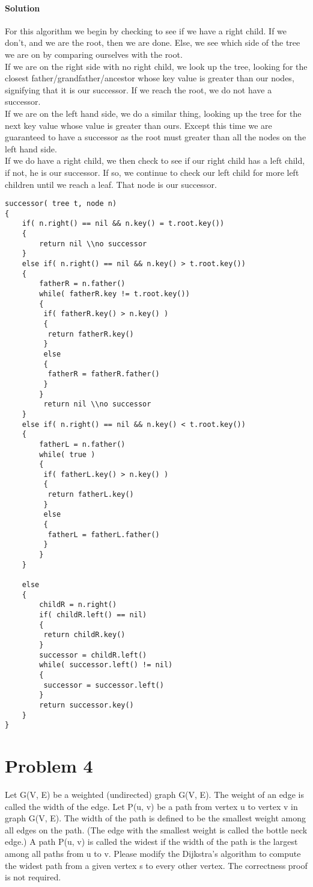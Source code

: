 \documentclass[12pt]{article}
\begin{document}
\paragraph{Solution}
For this algorithm we begin by checking to see if we have a right child.  If we don't, and we are the root, then we are done.
Else, we see which side of the tree we are on by comparing ourselves with the root.\\
If we are on the right side with no right child, we look up the tree, looking for the closest father/grandfather/ancestor whose key value is greater than our nodes, signifying that it
is our successor.  If we reach the root, we do not have a successor.
\\
If we are on the left hand side, we do a similar thing, looking up the tree for the next key value whose value is greater than ours.  Except this time we are guaranteed to have a successor
as the root must greater than all the nodes on the left hand side.
\\
If we do have a right child, we then check to see if our right child has a left child, if not, he is our successor.  If so, we continue to check our left child for more left children until we reach a leaf.  That node is our successor.

\begin{lstlisting}
successor( tree t, node n)
{
	if( n.right() == nil && n.key() = t.root.key())
	{
		return nil \\no successor
	}
	else if( n.right() == nil && n.key() > t.root.key())
	{
		fatherR = n.father()
		while( fatherR.key != t.root.key())
		{
		 if( fatherR.key() > n.key() )
		 {
		  return fatherR.key()
		 }
		 else
		 {
		  fatherR = fatherR.father()
		 }
		}
		 return nil \\no successor 
	}
	else if( n.right() == nil && n.key() < t.root.key())
	{
		fatherL = n.father()
		while( true )
		{
		 if( fatherL.key() > n.key() )
		 {
		  return fatherL.key()
		 }
		 else
		 {
		  fatherL = fatherL.father()
		 }
		}
	}
	
	else
	{
		childR = n.right()
		if( childR.left() == nil)
		{
		 return childR.key()
		}
		successor = childR.left()
		while( successor.left() != nil)
		{
		 successor = successor.left()
		}
		return successor.key()
	}
}
\end{lstlisting}

\section{Problem 4}
Let G(V, E) be a weighted (undirected) graph G(V, E). The weight of an edge is called the width of the edge. Let P(u, v) be a path from vertex u to vertex v in graph G(V, E). The width of the path is defined to be the smallest weight among all edges on the path. (The edge with the smallest weight is called the bottle neck edge.) A path P(u, v) is called the widest if the width of the path is the largest among all paths from u to v. Please modify the Dijkstra’s algorithm to compute the widest path from a given vertex s to every other vertex. The correctness proof is not required. 
\end{document}
